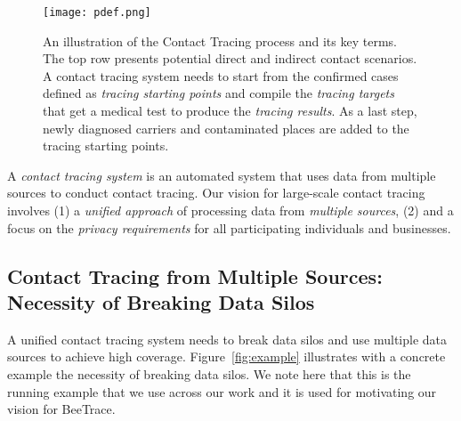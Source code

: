 \documentclass[11pt,dvipdfmx]{article}  %
\newcommand{\sysname}{\textsf{BeeTrace}\xspace}
\begin{document}
\begin{figure}
\centering
\texttt{[image: pdef.png]}
\caption{An illustration of the Contact Tracing process and its key terms. The top row presents potential direct and indirect contact scenarios. 
A contact tracing system needs to start from the confirmed cases defined as \emph{tracing starting points} and  compile the \emph{tracing targets} that get a medical test to produce the \emph{tracing results}. As a last step, newly diagnosed carriers and contaminated places are added to the tracing starting points.}
\label{problemdef}
\end{figure}

A \emph{contact tracing system} is an automated system that uses data from multiple sources to conduct contact tracing. Our vision for large-scale contact tracing involves (1) a \emph{unified approach} of processing data from \emph{multiple sources}, (2) and a focus on the  \emph{privacy requirements} for all participating individuals and businesses.

\subsection{Contact Tracing from Multiple Sources: Necessity of Breaking Data Silos}
\label{bds}

A unified contact tracing system needs to break data silos and use multiple data sources to achieve high coverage. Figure~\ref{fig:example} illustrates with a concrete example the necessity of breaking data silos. We note here that this is the running example that we use across our work and it is used for motivating our vision for \sysname.

\begin{figure*}[t!]
	\centering
	\caption{Real-world example of contact tracing based on Alice's outing.}
	\label{fig:example}	
\end{figure*}
\end{document}

